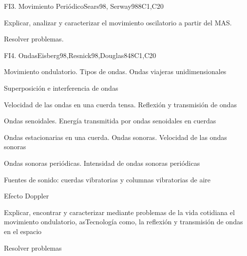 \begin{syllabus}
\begin{unit}{FI3. Movimiento Periódico}{Sears98, Serway98}{}{8}{C1,C20}
   \begin{learningoutcomes}
         \item  Explicar, analizar y caracterizar el movimiento oscilatorio a partir del MAS.
         \item  Resolver problemas.
   \end{learningoutcomes}
\end{unit}

\begin{unit}{FI4. Ondas}{Eisberg98,Resnick98,Douglas84}{}{8}{C1,C20}
\begin{topics}
         \item  Movimiento ondulatorio. Tipos de ondas. Ondas viajeras unidimensionales
	 \item  Superposición e interferencia de ondas
         \item  Velocidad de las ondas en una cuerda tensa. Reflexión y transmisión de ondas
	 \item  Ondas senoidales. Energía transmitida por ondas senoidales en cuerdas
         \item  Ondas estacionarias en una cuerda. Ondas sonoras. Velocidad de las ondas sonoras
	 \item  Ondas sonoras periódicas. Intensidad de ondas sonoras periódicas
	 \item  Fuentes de sonido: cuerdas vibratorias y columnas vibratorias de aire
	 \item  Efecto Doppler
   \end{topics}

   \begin{learningoutcomes}
         \item  Explicar, encontrar y caracterizar mediante problemas de la vida cotidiana el movimiento ondulatorio, asTecnología como, la reflexión y transmisión de ondas en el espacio
         \item  Resolver problemas
   \end{learningoutcomes}
\end{unit}


\end{syllabus}
